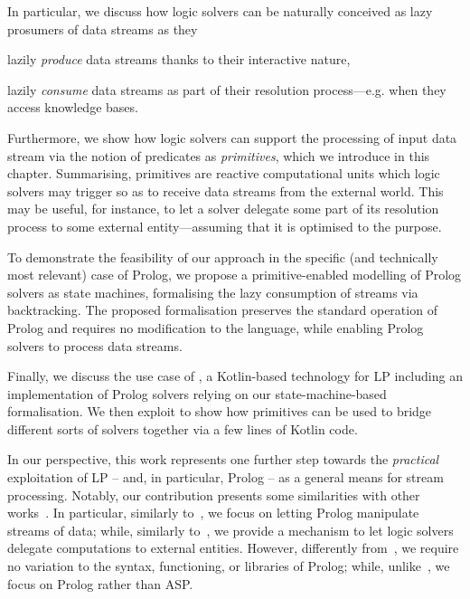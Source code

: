 \documentclass[12pt,a4paper,openright,twoside]{book}
\begin{document}
In particular, we discuss how logic solvers can be naturally conceived as lazy prosumers of data streams as they
%
\begin{inlinelist}
    \item lazily \emph{produce} data streams thanks to their interactive nature,
    \item lazily \emph{consume} data streams as part of their resolution process---e.g. when they access knowledge bases.
\end{inlinelist}
%
Furthermore, we show how logic solvers can support the processing of input data stream via the notion of predicates as \emph{primitives}, which we introduce in this chapter.
%
Summarising, primitives are reactive computational units which logic solvers may trigger so as to receive data streams from the external world.
%
This may be useful, for instance, to let a solver delegate some part of its resolution process to some external entity---assuming that it is optimised to the purpose.

To demonstrate the feasibility of our approach in the specific (and technically most relevant) case of Prolog, we propose a primitive-enabled modelling of Prolog solvers as state machines, formalising the lazy consumption of streams via backtracking.
%
The proposed formalisation preserves the standard operation of Prolog and requires no modification to the language, while enabling Prolog solvers to process data streams.

Finally, we discuss the use case of \twopkt{} \cite{cco-softwarex-2021-2pkt}, a Kotlin-based technology for LP including an implementation of Prolog solvers relying on our state-machine-based formalisation.
%
We then exploit \twopkt{} to show how primitives can be used to bridge different sorts of solvers together via a few lines of Kotlin code.

In our perspective, this work represents one further step towards the \emph{practical} exploitation of LP -- and, in particular, Prolog -- as a general means for stream processing.
%
Notably, our contribution presents some similarities with other works~\cite{Tarau2019,Redl16}.
%
In particular, similarly to~\cite{Tarau2019}, we focus on letting Prolog manipulate streams of data; while, similarly to~\cite{Redl16}, we provide a mechanism to let logic solvers delegate computations to external entities.
%
However, differently from~\cite{Tarau2019}, we require no variation to the syntax, functioning, or libraries of Prolog; while, unlike~\cite{Redl16}, we focus on Prolog rather than ASP.
\end{document}
